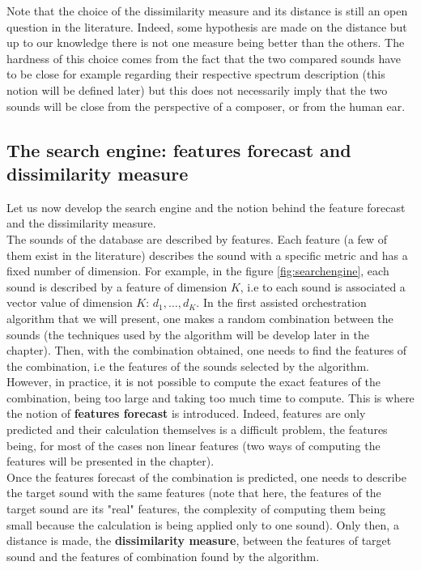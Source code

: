 \documentclass[a4paper]{book}
\begin{document}
Note that the choice of the dissimilarity measure and its distance is still an open question in the literature. Indeed, some hypothesis are made on the distance but up to our knowledge there is not one measure being better than the others. The hardness of this choice comes from the fact that the two compared sounds have to be close for example regarding their respective spectrum description (this notion will be defined later) but this does not necessarily imply that the two sounds will be close from the perspective of a composer, or from the human ear. 

\subsection{The search engine: features forecast and dissimilarity measure}
Let us now develop the search engine and the notion behind the feature forecast and the dissimilarity measure. \\

The sounds of the database are described by features. 
Each feature (a few of them exist in the literature) describes the sound with a specific metric and has a fixed number of dimension. For example, in the figure \ref{fig:searchengine}, each sound is described by a feature of dimension $K$, i.e to each sound is associated a vector value of dimension $K$: $d_1, \ldots, d_K$. In the first assisted orchestration algorithm that we will present, one makes a random combination between the sounds (the techniques used by the algorithm will be develop later in the chapter). Then, with the combination obtained, one needs to find the features of the combination, i.e the features of the sounds selected by the algorithm. However, in practice, it is not possible to compute the exact features of the combination, being too large and taking too much time to compute. This is where the notion of \textbf{features forecast} is introduced. Indeed, features are only predicted and their calculation themselves is a difficult problem, the features being, for most of the cases non linear features (two ways of computing the features will be presented in the chapter). \\
Once the features forecast of the combination is predicted, one needs to describe the target sound with the same features (note that here, the features of the target sound are its "real" features, the complexity of computing them being small because the calculation is being applied only to one sound). Only then, a distance is made, the \textbf{dissimilarity measure}, between the features of target sound and the features of combination found by the algorithm. \\
\end{document}
